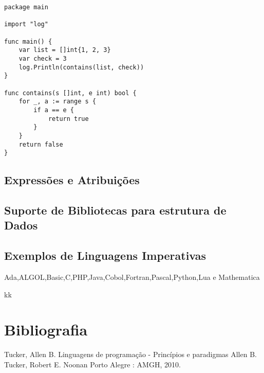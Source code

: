 \documentclass[11pt]{article}
\begin{document}
\begin{verbatim}
package main

import "log"

func main() {
	var list = []int{1, 2, 3}
	var check = 3
	log.Println(contains(list, check))
}

func contains(s []int, e int) bool {
	for _, a := range s {
		if a == e {
			return true
		}
	}
	return false
}
\end{verbatim}

\subsection{Expressões e Atribuições}
\label{sec:org4116f31}

\subsection{Suporte de Bibliotecas para estrutura de Dados}
\label{sec:orgc7ced55}

\subsection{Exemplos de Linguagens Imperativas}
\label{sec:org8717b60}

Ada,ALGOL,Basic,C,PHP,Java,Cobol,Fortran,Pascal,Python,Lua e Mathematica


kk


\section{Bibliografia}
\label{sec:org5c37155}


Tucker, Allen B.
Linguagens de programação - Princípios e paradigmas
Allen B. Tucker, Robert E. Noonan
Porto Alegre : AMGH, 2010.
\end{document}

